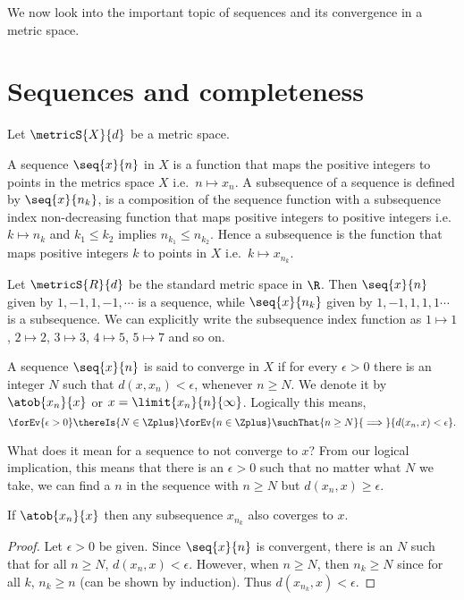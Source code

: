 We now look into the important topic of sequences and its convergence in a metric space.
\section{Sequences and completeness}
Let $\metricS{X}{d}$ be a metric space.
\begin{Definition}[name=Sequence]
    A sequence $\seq{x}{n}$ in $X$ is a function that maps the positive integers to points in the metrics
    space $X$ i.e.~$n\mapsto x_n$. A subsequence of a sequence is defined by $\seq{x}{n_k}$, is a composition
    of the sequence function with a subsequence index non-decreasing 
    function that maps positive integers to positive integers
    i.e.~$k\mapsto n_k$ and $k_1 \leq k_2$ implies $n_{k_1} \leq n_{k_2}$. 
    Hence a subsequence is the function that maps positive integers $k$ to  points in $X$
    i.e.~$k\mapsto x_{n_k}$.
\end{Definition}
\begin{Example}
    Let $\metricS{R}{d}$ be the standard metric space in $\R$. Then $\seq{x}{n}$ given by $1,-1,1,-1,\cdots$
    is a sequence, while $\seq{x}{n_k}$ given by $1,-1,1,1,1\cdots$ is a subsequence. We can explicitly write
    the subsequence index function as $1\mapsto 1$, $2\mapsto 2$, $3\mapsto 3$, $4\mapsto 5$, $5\mapsto 7$ and
    so on.
\end{Example}
\begin{Definition}[name=Convergence]
    A sequence $\seq{x}{n}$ is said to converge in $X$ if for every $\epsilon > 0$ there is an integer $N$
    such that $d(x,x_n) < \epsilon$, whenever $n \geq N$. We denote it by $\atob{x_n}{x}$ or $x =
    \limit{x_n}{n}{\infty}$. Logically this means,
    \[\forEv{\epsilon > 0}\thereIs{N\in\Zplus}\forEv{n\in\Zplus}\suchThat{n\geq N}{\implies}{d(x_n,x) <
	    \epsilon}.\]
\end{Definition}
What does it mean for a sequence to not converge to $x$? From our logical implication, this means that there
is an $\epsilon > 0$ such that no matter what $N$ we take, we can find a $n$ in the sequence with $n \geq N$
but $d(x_n,x) \geq \epsilon$.
\begin{Proposition}
    If $\atob{x_n}{x}$ then any subsequence $x_{n_k}$ also coverges to $x$.
\end{Proposition}
\begin{proof}
    Let $\epsilon > 0$ be given. Since $\seq{x}{n}$ is convergent, there is an $N$ such that for all $n\geq
    N$, $d(x_n,x) < \epsilon$. However, when $n \geq N$, then $n_k \geq N$ since for all $k$, $n_k \geq n$
    (can be shown by induction). Thus $d(x_{n_k},x) < \epsilon$.
\end{proof}

